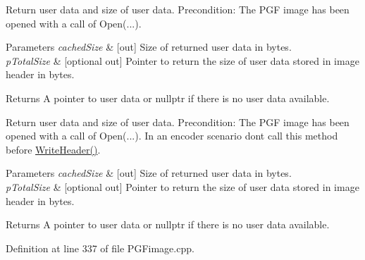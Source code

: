 Return user data and size of user data. Precondition\+: The P\+GF image has been opened with a call of Open(...). 
\begin{DoxyParams}{Parameters}
{\em cached\+Size} & \mbox{[}out\mbox{]} Size of returned user data in bytes. \\
\hline
{\em p\+Total\+Size} & \mbox{[}optional out\mbox{]} Pointer to return the size of user data stored in image header in bytes. \\
\hline
\end{DoxyParams}
\begin{DoxyReturn}{Returns}
A pointer to user data or nullptr if there is no user data available.
\end{DoxyReturn}
Return user data and size of user data. Precondition\+: The P\+GF image has been opened with a call of Open(...). In an encoder scenario don\textquotesingle{}t call this method before \mbox{\hyperlink{classCPGFImage_a1d853cd049417f0afc9a868664d7134d}{Write\+Header()}}. 
\begin{DoxyParams}{Parameters}
{\em cached\+Size} & \mbox{[}out\mbox{]} Size of returned user data in bytes. \\
\hline
{\em p\+Total\+Size} & \mbox{[}optional out\mbox{]} Pointer to return the size of user data stored in image header in bytes. \\
\hline
\end{DoxyParams}
\begin{DoxyReturn}{Returns}
A pointer to user data or nullptr if there is no user data available. 
\end{DoxyReturn}


Definition at line 337 of file P\+G\+Fimage.\+cpp.


\begin{DoxyCode}{0}

\end{DoxyCode}
\mbox{\label{classCPGFImage_a216a89fa33c755a379ba243610284b03}} 
